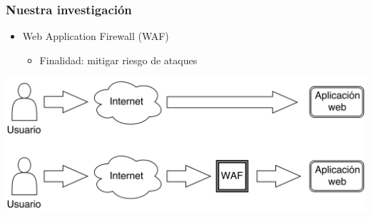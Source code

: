 \begin{frame}
    \frametitle{Nuestra investigación}

    \begin{itemize}
        \item
        Web Application Firewall (WAF)

        \begin{itemize}[<.->]
            \item
            Finalidad: mitigar riesgo de ataques
        \end{itemize}
    \end{itemize}

    \begin{center}
        \includegraphics[width=\textwidth]{images/web-app.png}
    \end{center}
\end{frame}


